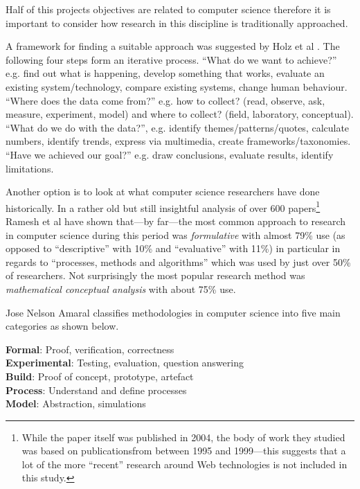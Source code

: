 Half of this projects objectives are related to computer science therefore it is important to consider how research in this discipline is traditionally approached.

A framework for finding a suitable approach was suggested by Holz et al \citeyear{Holz2006}. The following four steps form an iterative process. ``What do we want to achieve?'' e.g. find out what is happening, develop something that works, evaluate an existing system/technology, compare existing systems, change human behaviour. ``Where does the data come from?'' e.g. how to collect? (read, observe, ask, measure, experiment, model) and where to collect? (field, laboratory, conceptual). ``What do we do with the data?'', e.g. identify themes/patterns/quotes, calculate numbers, identify trends, express via multimedia, create frameworks/taxonomies. ``Have we achieved our goal?'' e.g. draw conclusions, evaluate results, identify limitations.


Another option is to look at what computer science researchers have done historically. In a rather old but still insightful analysis of over 600 papers\footnote{While the paper itself was published in 2004, the body of work they studied was based on publicationsfrom between 1995 and 1999---this suggests that a lot of the more ``recent'' research around Web technologies is not included in this study.} Ramesh et al \citeyear{Ramesh2004} have shown that---by far---the most common approach to research in computer science during this period was \emph{formulative} with almost 79\% use (as opposed to ``descriptive'' with 10\% and ``evaluative'' with 11\%) in particular in regards to ``processes, methods and algorithms'' which was used by just over 50\% of researchers. Not surprisingly the most popular research method was \emph{mathematical conceptual analysis} with about 75\% use.

Jose Nelson Amaral \citeyear{Amaral} classifies methodologies in computer science into five main categories as shown below.

\textbf{Formal}: Proof, verification, correctness\\
\textbf{Experimental}: Testing, evaluation, question answering\\
\textbf{Build}: Proof of concept, prototype, artefact\\
\textbf{Process}: Understand and define processes\\
\textbf{Model}: Abstraction, simulations

